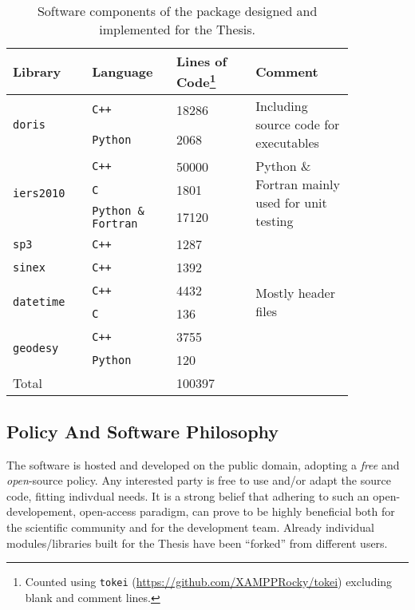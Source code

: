 \begin{table}[h!]
    \centering
    \begin{tabular}{p{0.20\linewidth} | p{0.2\linewidth} | p{0.20\linewidth} | p{0.25\linewidth}}
        \toprule
        \textbf{Library} & \textbf{Language} & \textbf{Lines of Code}\footnote{Counted using \texttt{tokei} (\url{https://github.com/XAMPPRocky/tokei}) excluding blank and comment lines.} & \textbf{Comment}\\
        \midrule
        \multirow{2}{*}{\texttt{doris}}  & \texttt{C++} & 18286 & \multirow{2}{4cm}{Including source code for executables}\\
          & \texttt{Python} & 2068 & \\
        \hline
        \multirow{3}{*}{\texttt{iers2010}}  & \texttt{C++} & 50000 & \multirow{3}{4cm}{Python \& Fortran mainly used for unit testing} \\
          & \texttt{C} & 1801 \\
          & \texttt{Python \& Fortran} &  17120 \\
        \hline
        \texttt{sp3}    & \texttt{C++} & 1287 & \\
        \hline
        \texttt{sinex}  & \texttt{C++} & 1392 & \\
        \hline
        \multirow{2}{*}{\texttt{datetime}}  & \texttt{C++} & 4432 & \multirow{2}{*}{Mostly header files}\\
          & \texttt{C}      & 136 \\
        \hline
        \multirow{2}{*}{\texttt{geodesy}}  & \texttt{C++} & 3755 & \multirow{2}{*}{}\\
          & \texttt{Python} & 120 \\
        \hline
        Total & & 100397\\
        \bottomrule
    \end{tabular}
    \caption{Software components of the package designed and implemented for the Thesis.}
    \label{table:software-components}
\end{table}

\subsection{Policy And Software Philosophy}\label{sec:the-software-policy}
The software is hosted and developed on the public domain, adopting a \emph{free} 
and \emph{open}-source policy. Any interested party is free to use and/or adapt 
the source code, fitting indivdual needs. It is a strong belief that adhering to 
such an open-developement, open-access paradigm, can prove to be highly beneficial 
both for the scientific community and for the development team. Already individual 
modules/libraries built for the Thesis have been ``forked'' from different users.

